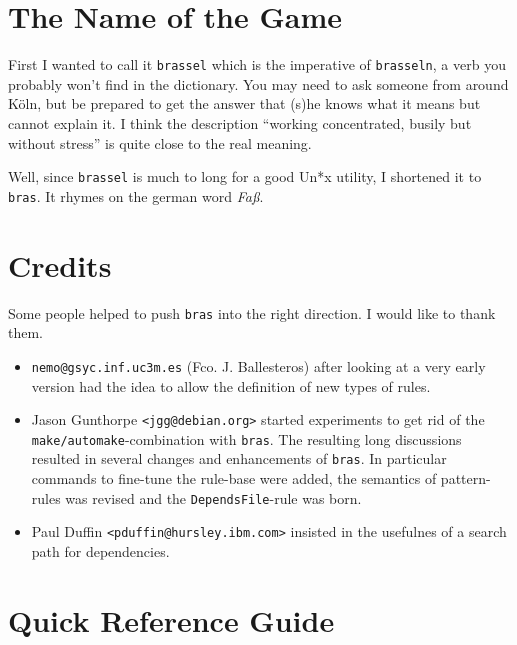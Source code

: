 \documentclass[12pt]{article}
\newcommand{\bras}{\texttt{bras}}
\begin{document}
\section{The Name of the Game}

First I wanted to call it \texttt{brassel} which is the imperative of
\texttt{brasseln}, a verb you probably won't find in the
dictionary. You may need to ask someone from around K\"oln, but be
prepared to get the answer that (s)he knows what it means but cannot
explain it. I think the description "`working concentrated, busily but
without stress"' is quite close to the real meaning.

Well, since \texttt{brassel} is much to long for a good
Un*x utility, I shortened it to \bras. It rhymes on the german word
\textit{Fa\ss}.

\section{Credits}

Some people helped to push \bras{} into the right direction. I
would like to thank them. 

\begin{itemize}
\item \texttt{nemo@gsyc.inf.uc3m.es} (Fco. J. Ballesteros) after
looking at a very early version had the
idea to allow the definition of new types of rules.

\item Jason Gunthorpe \texttt{<jgg@debian.org>} started
experiments to get rid of the \texttt{make/automake}-combination with
\bras{}. The resulting long discussions resulted in several changes
and enhancements of \bras{}. In particular commands to fine-tune the
rule-base were added, the semantics of pattern-rules was revised and
the \texttt{DependsFile}-rule was born.

\item Paul Duffin \texttt{<pduffin@hursley.ibm.com>} insisted in the
  usefulnes of a search path for dependencies.
\end{itemize}

\clearpage
\appendix

\section{Quick Reference Guide}
\newcommand{\Tt}[1]{\texttt{#1}}
\newcommand{\It}[1]{\textit{#1}}
\newcommand{\Flash}[1]{\fbox{\bfseries #1}}
\newcommand{\Sflabel}[1]{%
  \parbox[b]{\labelwidth}{%
    \makebox[1pt][l]{\textsf{\bfseries#1:}}\\\strut}}
  
\end{document}
